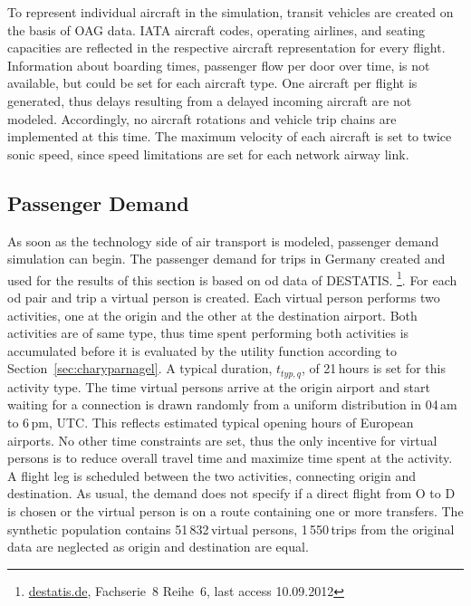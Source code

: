 To represent individual aircraft in the simulation, transit vehicles are created on the basis of OAG data. 
IATA aircraft codes, operating airlines, and seating capacities are reflected in the respective aircraft representation for every flight. 
Information about boarding times, \ie passenger flow per door over time, is not available, but could be set for each aircraft type. 
One aircraft per flight is generated, thus delays resulting from a delayed incoming aircraft are not modeled.
Accordingly, no aircraft rotations and vehicle trip chains are implemented at this time. 
The maximum velocity of each aircraft is set to twice sonic speed, since speed limitations are set for each network airway link. 

\subsection{Passenger Demand}
As soon as the technology side of air transport is modeled, passenger demand simulation can begin. 
The passenger demand for trips in Germany created and used for the results of this section is based on \gls{od} data of DESTATIS.%
\footnote{\url{destatis.de}, Fachserie~8 Reihe~6, last access 10.09.2012}.
% 
For each \gls{od} pair and trip a virtual person is created.
Each virtual person performs two activities, one at the origin and the other at the destination airport. 
Both activities are of same type, thus time spent performing both activities is accumulated before it is evaluated by the utility function according to Section~\ref{sec:charyparnagel}. %
A typical duration, $t_{typ,q}$, of 21\,hours is set for this activity type. 
The time virtual persons arrive at the origin airport and start waiting for a connection is drawn randomly from a uniform distribution in 04\,am to 6\,pm, UTC. 
This reflects estimated typical opening hours of European airports.
No other time constraints are set, thus the only incentive for virtual persons is to reduce overall travel time and maximize time spent at the activity. 
A flight leg is scheduled between the two activities, connecting origin and destination.
As usual, the demand does not specify if a direct flight from O to D is chosen or the virtual person is on a route containing one or more transfers.
The synthetic population contains 51\,832\,virtual persons, 1\,550\,trips from the original data are neglected as origin and destination are equal.

